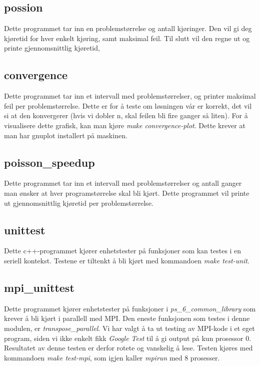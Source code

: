 \documentclass{article}
\begin{document}
\subsection{possion}
Dette programmet tar inn en problemstørrelse og antall kjøringer. Den vil gi deg kjøretid for hver enkelt kjøring, samt maksimal feil. Til slutt vil den regne ut og printe gjennomsnittlig kjøretid,

\subsection{convergence}
Dette programmet tar inn et intervall med problemstørrelser, og printer maksimal feil per problemstørrelse. Dette er for å teste om løsningen vår er korrekt, det vil si at den konvergerer (hvis vi dobler n, skal feilen bli fire ganger så liten). For å visualisere dette grafisk, kan man kjøre \emph{make convergence-plot}. Dette krever at man har gnuplot installert på maskinen.

\subsection{poisson\_speedup}
Dette programmet tar inn et intervall med problemstørrelser og antall ganger man ønsker at hver programstørrelse skal bli kjørt. Dette programmet vil printe ut gjennomsnittlig kjøretid per problemstørrelse.

\subsection{unittest}
\label{subsection:unittest}
Dette c++-programmet kjører enhetstester på funksjoner som kan testes i en seriell kontekst. Testene er tiltenkt å bli kjørt med kommandoen \emph{make test-unit}.

\subsection{mpi\_unittest}
\label{subsection:mpi_unittest}
Dette programmet kjører enhetstester på funksjoner i \emph{ps\_6\_common\_library} som krever å bli kjørt i parallell med MPI. Den eneste funksjonen som testes i denne modulen, er \emph{transpose\_parallel}. Vi har valgt å ta ut testing av MPI-kode i et eget program, siden vi ikke enkelt fikk \emph{Google Test} til å gi output på kun prosessor 0. Resultatet av denne testen er derfor rotete og vanskelig å lese. Testen kjøres med kommandoen \emph{make test-mpi}, som igjen kaller \emph{mpirun} med 8 prosesser.
\end{document}
